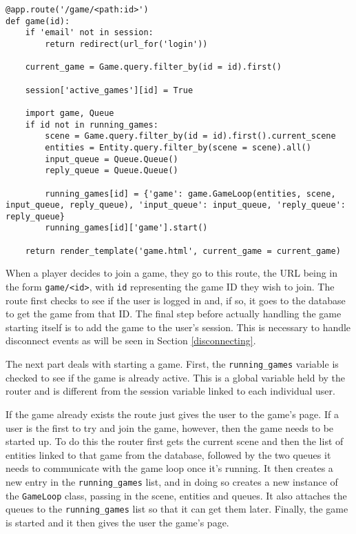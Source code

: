 \noindent
\begin{minipage}{\linewidth}
\begin{lstlisting}[style=py, caption={The route responsible for starting a game thread.}, label=game_route]
@app.route('/game/<path:id>')
def game(id):
    if 'email' not in session:
        return redirect(url_for('login'))

    current_game = Game.query.filter_by(id = id).first()

    session['active_games'][id] = True

    import game, Queue
    if id not in running_games:
        scene = Game.query.filter_by(id = id).first().current_scene
        entities = Entity.query.filter_by(scene = scene).all()
        input_queue = Queue.Queue()
        reply_queue = Queue.Queue()

        running_games[id] = {'game': game.GameLoop(entities, scene, input_queue, reply_queue), 'input_queue': input_queue, 'reply_queue': reply_queue}
        running_games[id]['game'].start()

    return render_template('game.html', current_game = current_game)
\end{lstlisting}
\end{minipage}

When a player decides to join a game, they go to this route, the URL being in the form \texttt{game/<id>}, with \texttt{id} representing the game ID they wish to join. The route first checks to see if the user is logged in and, if so, it goes to the database to get the game from that ID. The final step before actually handling the game starting itself is to add the game to the user's session. This is necessary to handle disconnect events as will be seen in Section \ref{disconnecting}.

The next part deals with starting a game. First, the \texttt{running\_games} variable is checked to see if the game is already active. This is a global variable held by the router and is different from the session variable linked to each individual user.

If the game already exists the route just gives the user to the game's page. If a user is the first to try and join the game, however, then the game needs to be started up. To do this the router first gets the current scene and then the list of entities linked to that game from the database, followed by the two queues it needs to communicate with the game loop once it's running. It then creates a new entry in the \texttt{running\_games} list, and in doing so creates a new instance of the \texttt{GameLoop} class, passing in the scene, entities and queues. It also attaches the queues to the \texttt{running\_games} list so that it can get them later. Finally, the game is started and it then gives the user the game's page.

